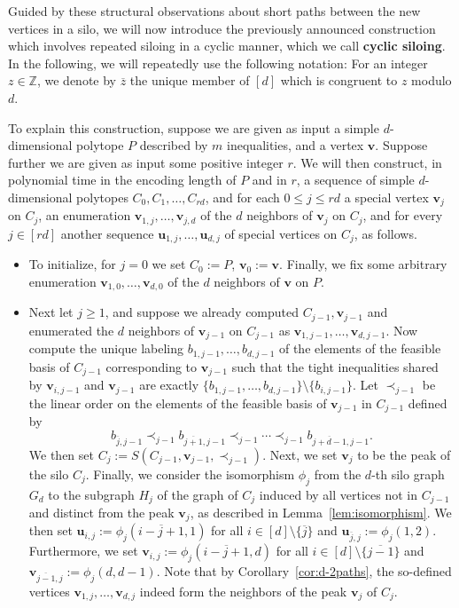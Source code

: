 \documentclass[centering,11pt,reqno]{amsart}
\theoremstyle{definition}
\begin{document}
Guided by these structural observations about short paths between the new vertices in a silo, we will now introduce the previously announced construction which involves repeated siloing in a cyclic manner, which we call \textbf{cyclic siloing}. In the following, we will repeatedly use the following notation: For an integer $z\in \mathbb{Z}$, we denote by $\overline{z}$ the unique member of $[d]$ which is congruent to $z$ modulo $d$. 

To explain this construction, suppose we are given as input a simple $d$-dimensional polytope $P$ described by $m$ inequalities, and a vertex $\mathbf{v}$. Suppose further we are given as input some positive integer $r$. We will then construct, in polynomial time in the encoding length of $P$ and in $r$, a sequence of simple $d$-dimensional polytopes $C_0,C_1,\ldots,C_{rd}$, and for each $0\le j\le rd$ a special vertex $\mathbf{v}_j$ on $C_j$, an enumeration $\mathbf{v}_{1,j},\ldots,\mathbf{v}_{j,d}$ of the $d$ neighbors of $\mathbf{v}_j$ on $C_j$, and for every $j\in [rd]$ another sequence $\mathbf{u}_{1,j},\ldots,\mathbf{u}_{d,j}$ of special vertices on $C_j$, as follows.

\begin{itemize}
    \item To initialize, for $j=0$ we set $C_0:=P$, $\mathbf{v}_0:=\mathbf{v}$. Finally, we fix some arbitrary enumeration $\mathbf{v}_{1,0},\ldots,\mathbf{v}_{d,0}$ of the $d$ neighbors of $\mathbf{v}$ on $P$.  
    \item Next let $j\ge 1$, and suppose we already computed $C_{j-1},\mathbf{v}_{j-1}$ and enumerated the $d$ neighbors of $\mathbf{v}_{j-1}$ on $C_{j-1}$ as $\mathbf{v}_{1,j-1},\ldots,\mathbf{v}_{d,j-1}$.
    Now compute the unique labeling $b_{1,j-1},\ldots,b_{d,j-1}$ of the elements of the feasible basis of $C_{j-1}$ corresponding to $\mathbf{v}_{j-1}$ such that the tight inequalities shared by $\mathbf{v}_{i,j-1}$ and $\mathbf{v}_{j-1}$ are exactly $\{b_{1,j-1},\ldots,b_{d,j-1}\}\setminus \{b_{i,j-1}\}$. Let $\prec_{j-1}$ be the linear order on the elements of the feasible basis of $\mathbf{v}_{j-1}$ in $C_{j-1}$ defined by $$b_{\overline{j},j-1}\prec_{j-1}b_{\overline{j+1},j-1}\prec_{j-1}\cdots\prec_{j-1}b_{\overline{j+d-1},j-1}.$$ We then set $C_j:=S(C_{j-1},\mathbf{v}_{j-1},\prec_{j-1})$. Next, we set $\mathbf{v}_j$ to be the peak of the silo $C_j$. Finally, we consider the isomorphism $\phi_j$ from the $d$-th silo graph $G_d$ to the subgraph $H_j$ of the graph of $C_j$ induced by all vertices not in $C_{j-1}$ and distinct from the peak $\mathbf{v}_{j}$, as described in Lemma~\ref{lem:isomorphism}. We then set $\mathbf{u}_{i,j}:=\phi_j(\overline{i-j+1},1)$ for all $i\in [d]\setminus \{\overline{j}\}$  and $\mathbf{u}_{\overline{j},j}:=\phi_j(1,2)$. Furthermore, we set $\mathbf{v}_{i,j}:=\phi_j(\overline{i-j+1},d)$ for all $i\in [d]\setminus \{\overline{j-1}\}$ and $\mathbf{v}_{\overline{j-1},j}:=\phi_j(d,d-1)$. Note that by Corollary~\ref{cor:d-2paths}, the so-defined vertices $\mathbf{v}_{1,j},\ldots,\mathbf{v}_{d,j}$ indeed form the neighbors of the peak $\mathbf{v}_j$ of $C_j$.
\end{itemize}
\end{document}

